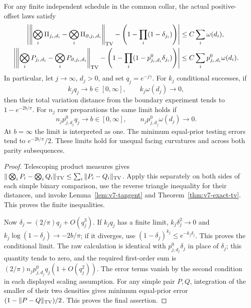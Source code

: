 \begin{theorem}\label{thm:v7-critical}
For any finite independent schedule in the common collar, the actual
positive-offset laws satisfy
\begin{align}
 \left|\left\|\bigotimes_i\Pi_{j_i,d_i}-
       \bigotimes_i\Pi_{\partial,j_i,d_i}\right\|_{\rm TV}
       -\left(1-\prod_i(1-\delta_{j_i})\right)\right|
      &\le C\sum_i\omega(d_i),\label{eq:v7-physical-cond}\\
 \left|\left\|\bigotimes_iP_{j_i,d_i}-
       \bigotimes_iP_{\partial,j_i,d_i}\right\|_{\rm TV}
       -\left(1-\prod_i(1-p_{j_i,d_i}^0\delta_{j_i})\right)\right|
      &\le C\sum_i p_{j_i,d_i}^0\omega(d_i).
                                      \label{eq:v7-physical-raw}
\end{align}
In particular, let $j\to\infty$, $d_j>0$, and set $q_j=e^{-j\gamma}$.
For $k_j$ conditional successes, if
\begin{equation}\label{eq:v7-critical-cond-scales}
 k_jq_j\longrightarrow b\in[0,\infty],\qquad
                 k_j\omega(d_j)\longrightarrow0,
\end{equation}
then their total variation distance from the boundary experiment tends
to $1-e^{-2b/\pi}$. For $n_j$ raw preparations the same limit holds if
\begin{equation}\label{eq:v7-critical-raw-scales}
 n_jp_{j,d_j}^0q_j\longrightarrow b\in[0,\infty],\qquad
                 n_jp_{j,d_j}^0\omega(d_j)\longrightarrow0.
\end{equation}
At $b=\infty$ the limit is interpreted as one. The minimum equal-prior
testing errors tend to $e^{-2b/\pi}/2$. These limits hold for unequal
facing curvatures and across both parity subsequences.
\end{theorem}
\begin{proof}
Telescoping product measures gives
$\|\bigotimes_iP_i-\bigotimes_iQ_i\|_{\rm TV}
\le\sum_i\|P_i-Q_i\|_{\rm TV}$. Apply this separately on both
sides of each simple binary comparison, use the reverse triangle
inequality for their distances, and invoke Lemma~\ref{lem:v7-tangent}
and Theorem~\ref{thm:v7-exact-tv}. This proves the finite inequalities.

Now $\delta_j=(2/\pi)q_j+O(q_j^3)$. If $k_jq_j$ has a finite limit,
$k_j\delta_j^2\to0$ and
$k_j\log(1-\delta_j)\to-2b/\pi$; if it diverges, use
$(1-\delta_j)^{k_j}\le e^{-k_j\delta_j}$. This proves the conditional
limit. The raw calculation is identical with
$p_{j,d_j}^0\delta_j$ in place of $\delta_j$; this quantity tends to
zero, and the required first-order sum is
$(2/\pi)n_jp_{j,d_j}^0q_j(1+O(q_j^2))$.
The error terms vanish by the second condition in each displayed
scaling assumption. For any simple pair $P,Q$, integration of the
smaller of their two densities gives minimum equal-prior error
$(1-\|P-Q\|_{\rm TV})/2$. This proves the final assertion.
\end{proof}


